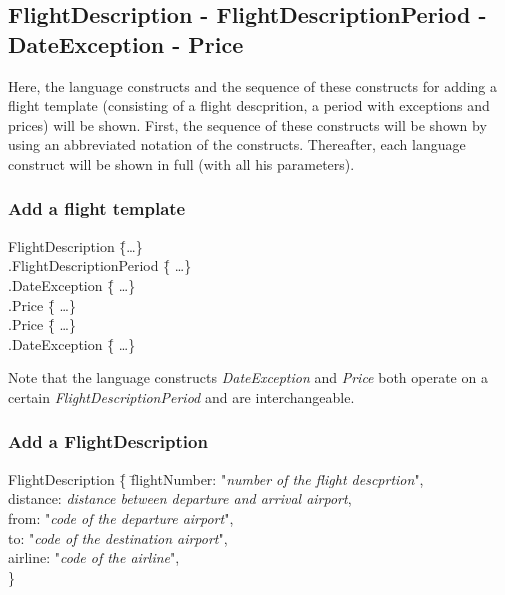 \documentclass[a4paper,11pt]{article}
\newcommand{\dsltype}[1]{\textit{#1}}
\begin{document}
\subsection*{FlightDescription - FlightDescriptionPeriod - DateException - Price}
Here, the language constructs and the sequence of these constructs for adding a flight template (consisting of a flight descprition, a period with exceptions and prices) will be shown. First, the sequence of these constructs will be shown by using an abbreviated notation of the constructs. Thereafter, each language construct will be shown in full (with all his parameters).

\subsubsection*{Add a flight template}
\begin{tabbing}
FlightDescription \= \{\ldots \} \\
\> .FlightDescriptionPeriod \= \{ \ldots \} \\
\> \> .DateException \= \{ \ldots \} \\
\> \> .Price \= \{ \ldots \} \\
\> \> .Price \= \{ \ldots \} \\
\> \> .DateException \= \{ \ldots \} \\
\end{tabbing}

Note that the language constructs \dsltype{DateException} and \dsltype{Price} both operate on a certain \dsltype{FlightDescriptionPeriod} and are interchangeable.

\subsubsection*{Add a FlightDescription}
\begin{tabbing}
FlightDescription \= \{ \= flightNumber: "\textit{number of the flight descprtion}", \\
	\> \> distance: \textit{distance between departure and arrival airport}, \\
	\> \> from: "\textit{code of the departure airport}", \\
	\> \> to: "\textit{code of the destination airport}", \\
	\> \> airline: "\textit{code of the airline}", \\
\> \} \\
\end{tabbing}
\end{document}
